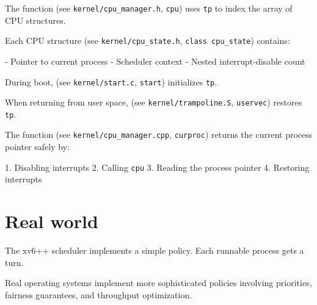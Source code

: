 The function
(see \texttt{kernel/cpu\_manager.h}, \texttt{cpu})
uses \lstinline{tp}
to index the array of CPU structures.

Each CPU structure
(see \texttt{kernel/cpu\_state.h}, \texttt{class cpu\_state})
contains:

- Pointer to current process  
- Scheduler context  
- Nested interrupt-disable count  

During boot,
(see \texttt{kernel/start.c}, \texttt{start})
initializes \lstinline{tp}.

When returning from user space,
(see \texttt{kernel/trampoline.S}, \texttt{uservec})
restores \lstinline{tp}.

The function
(see \texttt{kernel/cpu\_manager.cpp}, \texttt{curproc})
returns the current process pointer safely by:

1. Disabling interrupts  
2. Calling \texttt{cpu}  
3. Reading the process pointer  
4. Restoring interrupts  

\section{Real world}

The xv6++ scheduler implements a simple
policy.
Each runnable process gets a turn.

Real operating systems implement more sophisticated policies
involving priorities, fairness guarantees,
and throughput optimization.
